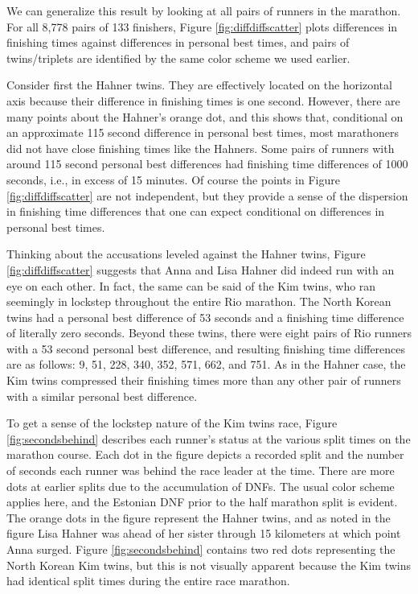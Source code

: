 \documentclass[12pt,titlepage]{article}
\begin{document}
We can generalize this result by looking at all pairs of runners in
the marathon.  For all 8,778 pairs of 133 finishers, Figure
\ref{fig:diffdiffscatter} plots differences in finishing times against
differences in personal best times, and pairs of twins/triplets are
identified by the same color scheme we used earlier.

Consider first the Hahner twins.  They are effectively located on the
horizontal axis because their difference in finishing times is one
second.  However, there are many points about the Hahner's orange dot,
and this shows that, conditional on an approximate 115 second
difference in personal best times, most marathoners did not have close
finishing times like the Hahners.  Some pairs of runners with around
115 second personal best differences had finishing time differences of
1000 seconds, i.e., in excess of 15 minutes.  Of course the points in
Figure \ref{fig:diffdiffscatter} are not independent, but they provide
a sense of the dispersion in finishing time differences that one can
expect conditional on differences in personal best times.

Thinking about the accusations leveled against the Hahner twins,
Figure \ref{fig:diffdiffscatter} suggests that Anna and Lisa Hahner
did indeed run with an eye on each other.  In fact, the same can be
said of the Kim twins, who ran seemingly in lockstep throughout the
entire Rio marathon.  The North Korean twins had a personal best
difference of 53 seconds and a finishing time difference of literally
zero seconds.  Beyond these twins, there were eight pairs of Rio
runners with a 53 second personal best difference, and resulting
finishing time differences are as follows: 9, 51, 228, 340, 352, 571,
662, and 751.  As in the Hahner case, the Kim twins compressed their
finishing times more than any other pair of runners with a similar
personal best difference.

To get a sense of the lockstep nature of the Kim twins race, Figure
\ref{fig:secondsbehind} describes each runner's status at the various
split times on the marathon course.  Each dot in the figure depicts a
recorded split and the number of seconds each runner was behind the
race leader at the time.  There are more dots at earlier splits due to
the accumulation of DNFs.  The usual color scheme applies here, and
the Estonian DNF prior to the half marathon split is evident.  The
orange dots in the figure represent the Hahner twins, and as noted in
the figure Lisa Hahner was ahead of her sister through 15 kilometers
at which point Anna surged.  Figure \ref{fig:secondsbehind} contains
two red dots representing the North Korean Kim twins, but this is not
visually apparent because the Kim twins had identical split times
during the entire race marathon.
\end{document}
